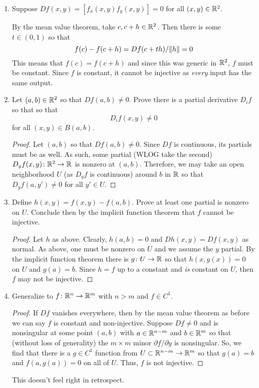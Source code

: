 \documentclass{article}
\begin{document}
\begin{enumerate}[start=1,label={(\alph*)}]
  \item Suppose $Df(x, y) = [ f_{x}(x, y) f_{y}(x,y) ] = 0$ for all $(x, y) \in \RR[2]$.

        By the mean value theorem, take $c, c + h \in \RR[2]$. Then there is some $t \in (0, 1)$ so that
        \[ f(c) - f(c + h) = Df(c + th)/\norm{h} = 0 \]
        This means that $f(c) = f(c + h)$ and since this was generic in $\RR[2]$, $f$ must be constant.
        Since $f$ is constant, it cannot be injective as \emph{every} input has the same output.

  \item Let $(a, b) \in \RR[2]$ so that $Df(a, b) \ne 0$. Prove there is a partial derivative $D_{i}f$ so that so that
        \[ D_{i}f(x, y) \ne 0 \]
        for all $(x, y) \in B(a, b)$.

        \begin{proof}
          Let $(a, b)$ so that $Df(a, b) \ne 0$. Since $Df$ is continuous, its partials must be as well.
          As such, some partial (WLOG take the second) $D_{y}f(x, y) \from \RR[2] \to \RR$ is nonzero at $(a, b)$.
          Therefore, we may take an open neighborhood $U$ (as $D_{y}f$ is continuous)
          around $b$ in $\RR$ so that $D_{y}f(a, y') \ne 0$ for all $y' \in U$.
        \end{proof}

  \item Define $h(x, y) = f(x, y) - f(a, b)$. Prove at least one partial is nonzero on $U$. Conclude then by the implicit function theorem
        that $f$ cannot be injective.

        \begin{proof}
          Let $h$ as above. Clearly, $h(a, b) = 0$ and $Dh(x, y) = Df(x, y)$ as normal.
          As above, one must be nonzero on $U$ and we assume the $y$ partial.
          By the implicit function theorem there is $g \from U \to \RR$ so that $h(x, g(x)) = 0$ on $U$ and $g(a) = b$.
          Since $h = f$ up to a constant and \emph{is} constant on $U$, then $f$ may not be injective.
        \end{proof}

  \item Generalize to $f \from \RR[n] \to \RR[m]$ with $n > m$ and $f \in C^{1}$.

        \begin{proof}
          If $Df$ vanishes everywhere, then by the mean value theorem as before we can say $f$ is constant and non-injective.
          Suppose $Df \ne 0$ and is nonsingular at some point $(a, b)$ with $a \in \RR[n - m]$ and $b \in \RR[m]$
          so that (without loss of generality) the $m \times m$ minor $\partial f / \partial y$ is nonsingular.
          So, we find that there is a $g \in C^{1}$ function from $U \subset \RR[n - m] \to \RR[m]$ so that $g(a) = b$ and $f(a, g(a)) = 0$
          on all of $U$. Thus, $f$ is not injective.
        \end{proof}

        This doesn't feel right in retrospect.
\end{enumerate}
\end{document}
